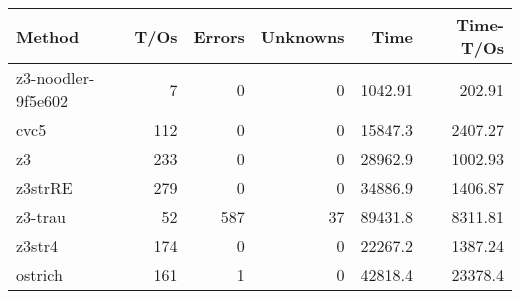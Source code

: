 \begin{tabular}{lrrrrr}
\hline
 Method             &   T/Os &   Errors &   Unknowns &     Time &   Time-T/Os \\
\hline
 z3-noodler-9f5e602 &      7 &        0 &          0 &  1042.91 &      202.91 \\
 cvc5               &    112 &        0 &          0 & 15847.3  &     2407.27 \\
 z3                 &    233 &        0 &          0 & 28962.9  &     1002.93 \\
 z3strRE            &    279 &        0 &          0 & 34886.9  &     1406.87 \\
 z3-trau            &     52 &      587 &         37 & 89431.8  &     8311.81 \\
 z3str4             &    174 &        0 &          0 & 22267.2  &     1387.24 \\
 ostrich            &    161 &        1 &          0 & 42818.4  &    23378.4  \\
\hline
\end{tabular}
